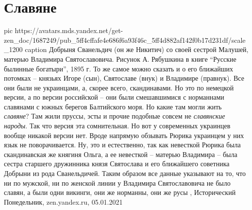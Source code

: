  
 
 
 
 
\chapter{Славяне}
\label{sec:slova.slavjane}

\ifcmt
  pic https://avatars.mds.yandex.net/get-zen_doc/1687249/pub_5ff4cffafe4e686f6a93f46c_5ff4d882af142f0b17d231df/scale_1200
	caption Добрыня Сванельдич (он же Никитич) со своей сестрой Малушей, матерью Владимира Святославовича. Рисунок А. Рябушкина в книге \enquote{Русские былинные богатыри}, 1895 г.
\fi
То же самое можно сказать и о его ближайших потомках – князьях Игоре (сын),
Святославе (внук) и Владимире (правнук). Все они были не украинцами, а, скорее
всего, скандинавами. Но это по немецкой версии, а по версии российской – они
были смешавшимися с норманнами славянами с южных берегов Балтийского моря. Но
какие там могли жить \emph{славяне}? Там жили пруссы, эсты и прочие подобные
совсем не \emph{славянские народы}. Так что версия эта сомнительная.  Но вот у
современных украинцев вообще никакой версии нет. Вроде напрямую обзывать Рюрика
украинцем у них язык не поворачивается. Ну, это и естественно, так как
невесткой Рюрика была скандинавская же княгиня Ольга, а ее невесткой – матерью
Владимира – была сестра старшего дружинника князя Святослава и его ближайшего
советника Добрыни из рода Сванельдичей. Таким образом все данные указывают на
то, что ни по мужской, ни по женской линии у Владимира Святославовича не было
славян, а были одни викинги, они же норманны, они же русы
,
Исторический Понедельник, zen.yandex.ru, 05.01.2021 

